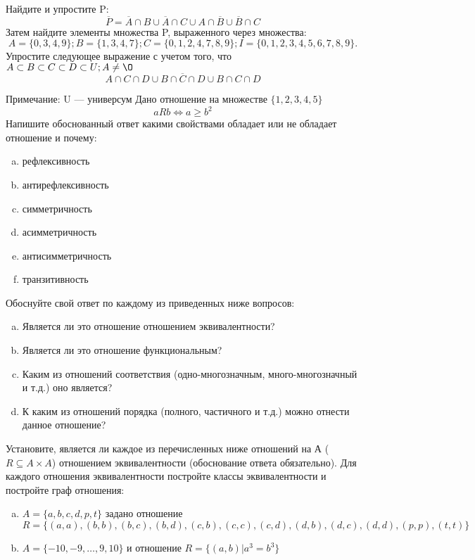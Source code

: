 \documentclass[10pt]{exam}
\begin{document}
\begin{questions}
\question
Найдите и упростите P:
\begin{equation*}
\overline{P} = \overline{A} \cap B \cup \overline{A} \cap C \cup A \cap \overline{B} \cup \overline{B} \cap C
\end{equation*}
Затем найдите элементы множества P, выраженного через множества:
\begin{equation*}
A = \{0, 3, 4, 9\}; 
B = \{1, 3, 4, 7\};
C = \{0, 1, 2, 4, 7, 8, 9\};
I = \{0, 1, 2, 3, 4, 5, 6, 7, 8, 9\}.
\end{equation*}\question
Упростите следующее выражение с учетом того, что $A\subset B \subset C \subset D \subset U; A \neq \O$
\begin{equation*}
A \cap C  \cap D \cup B \cap \overline{C} \cap D \cup B \cap C \cap D
\end{equation*}

Примечание: U — универсум\question
Дано отношение на множестве $\{1, 2, 3, 4, 5\}$ 
\begin{equation*}
aRb \iff a \geq b^2
\end{equation*}
Напишите обоснованный ответ какими свойствами обладает или не обладает отношение и почему:   
\begin{enumerate} [a)]\setcounter{enumi}{0}
\item рефлексивность
\item антирефлексивность
\item симметричность
\item асимметричность
\item антисимметричность
\item транзитивность
\end{enumerate}

Обоснуйте свой ответ по каждому из приведенных ниже вопросов:
\begin{enumerate} [a)]\setcounter{enumi}{0}
    \item Является ли это отношение отношением эквивалентности?
    \item Является ли это отношение функциональным?
    \item Каким из отношений соответствия (одно-многозначным, много-многозначный и т.д.) оно является?
    \item К каким из отношений порядка (полного, частичного и т.д.) можно отнести данное отношение?
\end{enumerate}


\question
Установите, является ли каждое из перечисленных ниже отношений на А ($R \subseteq A \times A$) отношением эквивалентности (обоснование ответа обязательно). Для каждого отношения эквивалентности постройте классы 
эквивалентности и постройте граф отношения:
\begin{enumerate} [a)]\setcounter{enumi}{0}
\item $A = \{a, b, c, d, p, t\}$ задано отношение $R = \{(a, a), (b, b), (b, c), (b, d), (c, b), (c, c), (c, d), (d, b), (d, c), (d, d), (p,p), (t,t)\}$
\item $A = \{-10, -9, … , 9, 10\}$ и отношение $R = \{(a,b)|a^{3} = b^{3}\}$


\end{enumerate}
\end{questions}
\end{document}
